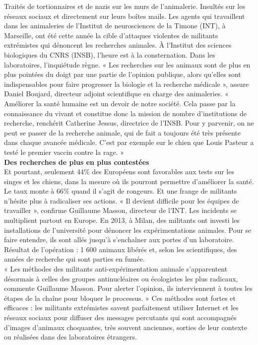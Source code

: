 \documentclass[8pt]{article}
\begin{document}
Traités de tortionnaires et de nazis sur les murs de l’animalerie. Insultés sur les réseaux sociaux et directement sur leurs boîtes mails. Les agents qui travaillent dans les animaleries de l’Institut de neurosciences de la Timone (INT), à Marseille, ont été cette année la cible d’attaques violentes de militants extrémistes qui dénoncent les recherches animales. À l’Institut des sciences biologiques du CNRS (INSB), l’heure est à la consternation. Dans les laboratoires, l’inquiétude règne. « Les recherches sur les animaux sont de plus en plus pointées du doigt par une partie de l’opinion publique, alors qu’elles sont indispensables pour faire progresser la biologie et la recherche médicale », assure Daniel Boujard, directeur adjoint scientifique en charge des animaleries. « Améliorer la santé humaine est un devoir de notre société. Cela passe par la connaissance du vivant et constitue donc la mission de nombre d’institutions de recherche, renchérit Catherine Jessus, directrice de l’INSB. Pour y parvenir, on ne peut se passer de la recherche animale, qui de fait a toujours été très présente dans chaque avancée médicale. C’est par exemple sur le chien que Louis Pasteur a testé le premier vaccin contre la rage. »\\

\textbf{Des recherches de plus en plus contestées}\\

Et pourtant, seulement 44\% des Européens sont favorables aux tests sur les singes et les chiens, dans la mesure où ils pourront permettre d’améliorer la santé. Le taux monte à 66\% quand il s’agit de rongeurs. Et une frange de militants n’hésite plus à radicaliser ses actions. « Il devient difficile pour les équipes de travailler », confirme Guillaume Masson, directeur de l’INT. Les incidents se multiplient partout en Europe. En 2013, à Milan, des militants ont investi les installations de l’université pour dénoncer les expérimentations animales. Pour se faire entendre, ils sont allés jusqu’à s’enchaîner aux portes d’un laboratoire. Résultat de l’opération : 1 600 animaux libérés et, selon les scientifiques, des années de recherche qui sont parties en fumée.\\


« Les méthodes des militants anti-expérimentation animale s’apparentent désormais à celles des groupes antinucléaires ou écologistes les plus radicaux, commente Guillaume Masson. Pour alerter l’opinion, ils interviennent à toutes les étapes de la chaîne pour bloquer le processus. » Ces méthodes sont fortes et efficaces : les militants extrémistes savent parfaitement utiliser Internet et les réseaux sociaux pour diffuser des messages percutants qui sont accompagnés d’images d’animaux choquantes, très souvent anciennes, sorties de leur contexte ou réalisées dans des laboratoires étrangers.\\
\end{document}
